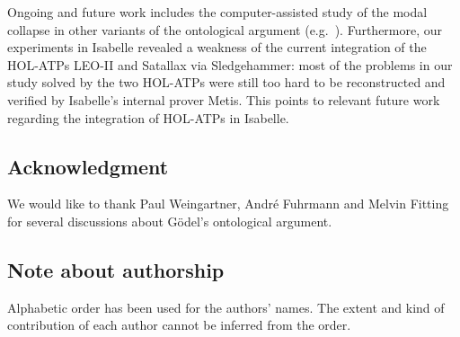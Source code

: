 \documentclass{birkmult}
\theoremstyle{definition}
\theoremstyle{remark}
\numberwithin{equation}{section}
\begin{document}
Ongoing and future work includes the computer-assisted 
study of the modal collapse in
other variants of the ontological argument (e.g.~\cite{bjordal99,fuhrmann05:_exist_notwen}). Furthermore, our experiments in Isabelle revealed a weakness of the current integration of the HOL-ATPs LEO-II and Satallax via Sledgehammer: most of the problems in our study solved by the two HOL-ATPs were still too hard to be reconstructed and verified by Isabelle's internal prover Metis. This points to relevant future work regarding the integration of HOL-ATPs in Isabelle.
 


\subsection*{Acknowledgment}

We would like to thank Paul Weingartner, Andr\'{e} Fuhrmann 
and Melvin Fitting for several discussions about 
G\"odel's ontological argument.


\subsection*{Note about authorship}

Alphabetic order has been used for the authors' names. 
The extent and kind of contribution of each author 
cannot be inferred from the order.



\end{document}
